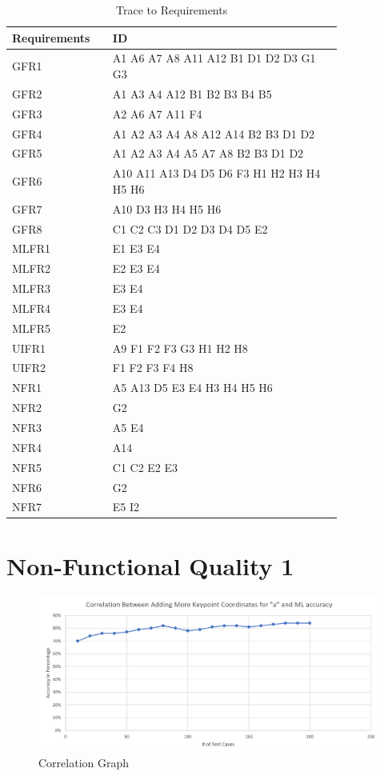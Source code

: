 \documentclass[12pt, titlepage]{article}
\begin{document}
\renewcommand{\arraystretch}{1.2}
\noindent \begin{longtable}{p{0.22\linewidth}|p{0.6\linewidth}}
\hline
\textbf{Requirements} & \textbf{ID}\\
\hline
GFR1 & A1 A6 A7 A8 A11 A12 B1 D1 D2 D3 G1 G3\\ \hline
GFR2 & A1 A3 A4 A12 B1 B2 B3 B4 B5\\ \hline
GFR3 & A2 A6 A7 A11 F4\\ \hline
GFR4 & A1 A2 A3 A4 A8 A12 A14 B2 B3 D1 D2\\ \hline
GFR5 & A1 A2 A3 A4 A5 A7 A8 B2 B3 D1 D2\\ \hline
GFR6 & A10 A11 A13 D4 D5 D6 F3 H1 H2 H3 H4 H5 H6\\ \hline
GFR7 & A10 D3 H3 H4 H5 H6\\ \hline
GFR8 & C1 C2 C3 D1 D2 D3 D4 D5 E2\\ \hline
MLFR1 & E1 E3 E4\\ \hline
MLFR2 & E2 E3 E4\\ \hline
MLFR3 & E3 E4\\ \hline
MLFR4 & E3 E4\\ \hline
MLFR5 & E2\\ \hline
UIFR1 & A9 F1 F2 F3 G3 H1 H2 H8\\ \hline
UIFR2 & F1 F2 F3 F4 H8\\ \hline
NFR1 & A5 A13 D5 E3 E4 H3 H4 H5 H6\\ \hline
NFR2 & G2\\ \hline
NFR3 & A5 E4\\ \hline
NFR4 & A14\\ \hline
NFR5 & C1 C2 E2 E3\\ \hline
NFR6 & G2\\ \hline
NFR7 & E5 I2
\hline
\caption{Trace to Requirements}
\end{longtable}
		
\section{Non-Functional Quality 1}	

\begin{figure}[H] 
\centering
\includegraphics[width=\textwidth,height=0.4\textheight,keepaspectratio]{correlation.PNG} 
\caption{Correlation Graph} 
\label{Fig.Correlation} 
\end{figure}
\end{document}
